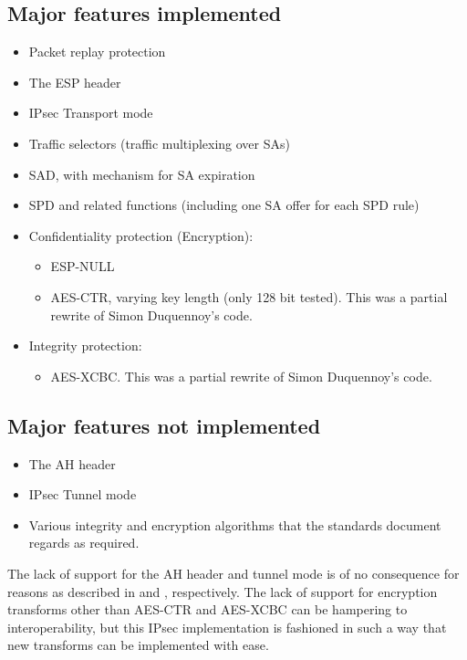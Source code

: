 \documentclass[final,a4paper,twoside,11pt,onecolumn]{report}
\begin{document}
\subsection{Major features implemented}
\begin{itemize}
   \item Packet replay protection
   \item The ESP header
   \item IPsec Transport mode
   \item Traffic selectors (traffic multiplexing over SAs)
   \item SAD, with mechanism for SA expiration
   \item SPD and related functions (including one SA offer for each SPD rule)
   \item Confidentiality protection (Encryption): 
   \begin{itemize}
      \item ESP-NULL
      \item AES-CTR, varying key length (only 128 bit tested). This was a partial rewrite of Simon Duquennoy's code.
   \end{itemize}
   \item Integrity protection:
   \begin{itemize}
           \item AES-XCBC. This was a partial rewrite of Simon Duquennoy's code.
   \end{itemize}
\end{itemize}

\subsection{Major features not implemented}
\label{ipsec-features-not-imp}
\begin{itemize}
        \item The AH header
        \item IPsec Tunnel mode
        \item Various integrity and encryption algorithms that the standards document regards as required.
\end{itemize}

The lack of support for the AH header and tunnel mode is of no consequence for reasons as described in  and , respectively. The lack of support for encryption transforms other than AES-CTR and AES-XCBC can be hampering to interoperability, but this IPsec implementation is fashioned in such a way that new transforms can be implemented with ease.
\end{document}
